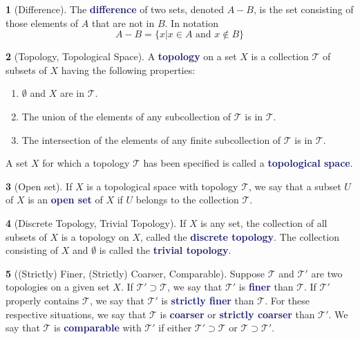 \documentclass[12pt]{article}
\newcommand{\navy}[1]{\textcolor{MidnightBlue}{\bf #1}}
\theoremstyle{plain}
\theoremstyle{definition}
\newtheorem{definition}{\color{MidnightBlue}{\textbf{Definition}}}[section]
\newcommand{\1}{\mathbbm 1}
\newcommand{\tT}{\mathcal T}
\begin{document}
\begin{definition}[Difference]
The \navy{difference} of two sets, denoted $A-B$, is the set consisting of those elements of $A$ that are not in $B$. In notation
\begin{equation*}
A - B = \{x | x \in A \text{ and } x \not\in B\}
\end{equation*}
\end{definition}

\begin{definition}[Topology, Topological Space]
A \navy{topology} on a set $X$ is a collection $\tT$ of subsets of $X$ having the following properties:
\begin{enumerate}
\item $\emptyset$ and $X$ are in $\tT$.
\item The union of the elements of any subcollection of $\tT$ is in $\tT$.
\item The intersection of the elements of any finite subcollection of $\tT$ is in $\tT$.
\end{enumerate}
A set $X$ for which a topology $\tT$ has been specified is called a \navy{topological space}.
\end{definition}

\begin{definition}[Open set]
If $X$ is a topological space with topology $\tT$, we say that a subset $U$ of $X$ is an \navy{open set} of $X$ if $U$ belongs to the collection $\tT$.
\end{definition}

\begin{definition}[Discrete Topology, Trivial Topology]
If $X$ is any set, the collection of all subsets of $X$ is a topology on $X$, called the \navy{discrete topology}. The collection consisting of $X$ and $\emptyset$ is called the \navy{trivial topology}.
\end{definition}

\begin{definition}[(Strictly) Finer, (Strictly) Coarser, Comparable]
Suppose $\tT$ and $\tT'$ are two topologies on a given set $X$. If $\tT' \supset \tT$, we say that $\tT'$ is \navy{finer} than $\tT$. If $\tT'$ properly contains $\tT$, we say that $\tT'$ is \navy{strictly finer} than $\tT$. For these respective situations, we say that $\tT$ is \navy{coarser} or \navy{strictly coarser} than $\tT'$. We say that $\tT$ is \navy{comparable} with $\tT'$ if either $\tT' \supset \tT$ or $\tT \supset \tT'$.
\end{definition}
\end{document}
